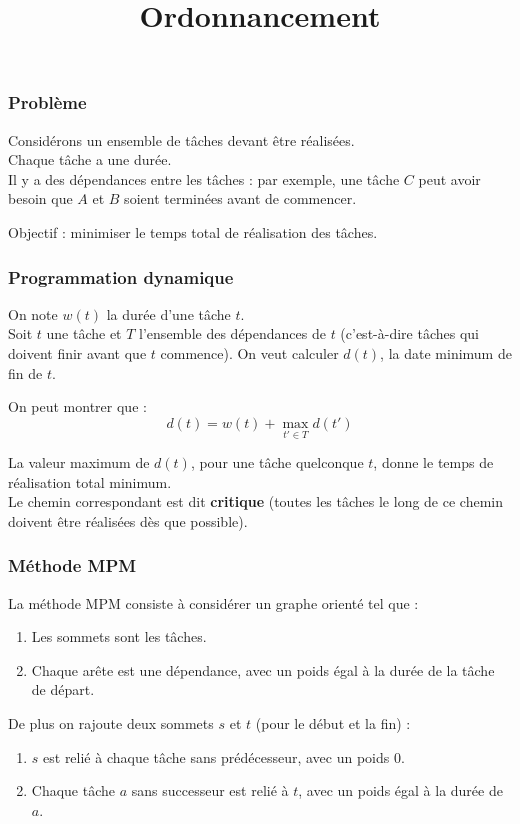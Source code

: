\documentclass[draft]{beamer}
\begin{document}
\title{Ordonnancement}

\begin{frame}
    \titlepage
\end{frame}

\begin{frame}[fragile]
    \frametitle{Problème}
    Considérons un ensemble de tâches devant être réalisées.\\
    Chaque tâche a une durée.\\
    Il y a des dépendances entre les tâches : par exemple, une tâche $C$ peut avoir besoin que $A$ et $B$ soient terminées avant de commencer.
    \vspace{2\baselineskip}
    \pause

    Objectif : minimiser le temps total de réalisation des tâches.
\end{frame}

\begin{frame}
    \frametitle{Programmation dynamique}
    On note $w(t)$ la durée d'une tâche $t$.\\
    Soit $t$ une tâche et $T$ l'ensemble des dépendances de $t$ (c'est-à-dire tâches qui doivent finir avant que $t$ commence).
    On veut calculer $d(t)$, la date minimum de fin de $t$.
    \pause
    \vspace{\baselineskip}

    On peut montrer que :
    $$\boxed{d(t) = w(t) + \max_{t' \in T} d(t')}$$
    \pause
    \vspace{\baselineskip}

    La valeur maximum de $d(t)$, pour une tâche quelconque $t$, donne le temps de réalisation total minimum.\\
    Le chemin correspondant est dit \textbf{critique} (toutes les tâches le long de ce chemin doivent être réalisées dès que possible).
\end{frame}

\begin{frame}[fragile]
    \frametitle{Méthode MPM}
    La méthode MPM consiste à considérer un graphe orienté tel que :
    \begin{enumerate}
        \item Les sommets sont les tâches.
        \item Chaque arête est une dépendance, avec un poids égal à la durée de la tâche de départ.
    \end{enumerate}
    \pause

    De plus on rajoute deux sommets $s$ et $t$ (pour le début et la fin) :
    \begin{enumerate}
        \item $s$ est relié à chaque tâche sans prédécesseur, avec un poids 0.
        \item Chaque tâche $a$ sans successeur est relié à $t$, avec un poids égal à la durée de $a$.
    \end{enumerate}
\end{frame}
\end{document}
